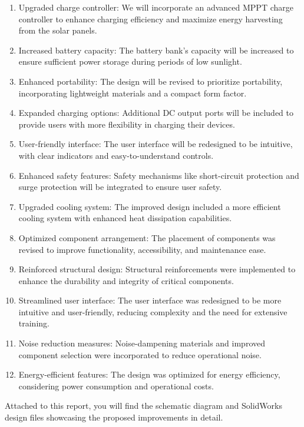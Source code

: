 \documentclass[twocolumn]{article}
\begin{document}
\begin{enumerate}
    \item Upgraded charge controller: We will incorporate an advanced MPPT charge controller to enhance charging efficiency and maximize energy harvesting from the solar panels.
    \item Increased battery capacity: The battery bank's capacity will be increased to ensure sufficient power storage during periods of low sunlight.
    \item Enhanced portability: The design will be revised to prioritize portability, incorporating lightweight materials and a compact form factor.
    \item Expanded charging options: Additional DC output ports will be included to provide users with more flexibility in charging their devices.
    \item User-friendly interface: The user interface will be redesigned to be intuitive, with clear indicators and easy-to-understand controls.
    \item Enhanced safety features: Safety mechanisms like short-circuit protection and surge protection will be integrated to ensure user safety.
    \item Upgraded cooling system: The improved design included a more efficient cooling system with enhanced heat dissipation capabilities.
    \item Optimized component arrangement: The placement of components was revised to improve functionality, accessibility, and maintenance ease.
    \item Reinforced structural design: Structural reinforcements were implemented to enhance the durability and integrity of critical components.
    \item Streamlined user interface: The user interface was redesigned to be more intuitive and user-friendly, reducing complexity and the need for extensive training.
    \item Noise reduction measures: Noise-dampening materials and improved component selection were incorporated to reduce operational noise.
    \item Energy-efficient features: The design was optimized for energy efficiency, considering power consumption and operational costs.
\end{enumerate}

\noindent Attached to this report, you will find the schematic diagram and SolidWorks design files showcasing the proposed improvements in detail.\
\end{document}
